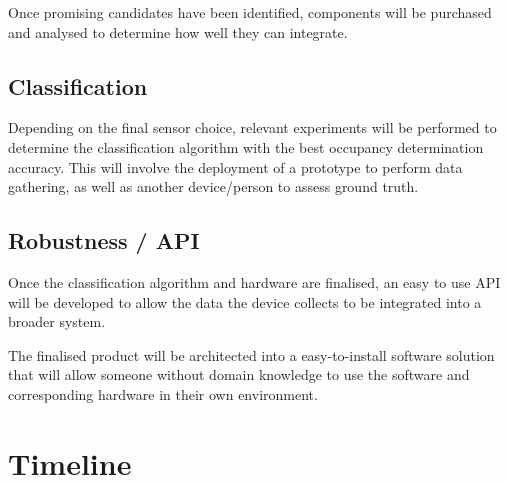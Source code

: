 \documentclass[12pt, a4paper]{article}
\begin{document}
Once promising candidates have been identified, components will be purchased and analysed to determine how well they can integrate.

\subsection*{Classification}
Depending on the final sensor choice, relevant experiments will be performed to determine the classification algorithm with the best occupancy determination accuracy. This will involve the deployment of a prototype to perform data gathering, as well as another device/person to assess ground truth.

\subsection*{Robustness / API}
Once the classification algorithm and hardware are finalised, an easy to use API will be developed to allow the data the device collects to be integrated into a broader system.

The finalised product will be architected into a easy-to-install software solution that will allow someone without domain knowledge to use the software and corresponding hardware in their own environment.


\section*{Timeline}
\end{document}

